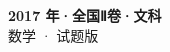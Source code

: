 \documentclass[zihao=-4, a4paper]{ctexart}
\begin{document}
\begin{center}
  {\Large\bfseries 2017 年·全国Ⅱ卷·文科}\\[4pt]
  {\large 数学 · 试题版}
\end{center}
\medskip
{}

\end{document}
